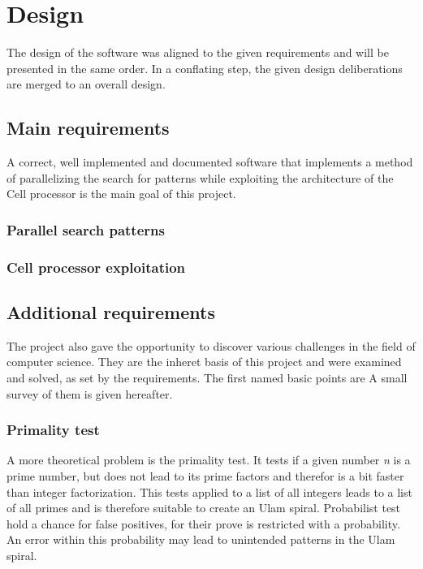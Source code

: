\section{Design}
\label{sec:design}
The design of the software was aligned to the given requirements and will be presented in the same order. In a conflating step, the given design deliberations are merged to an overall design.

\subsection{Main requirements}
\label{sec:main_req}
A correct, well implemented and documented software that implements a method of parallelizing the search for patterns while exploiting the architecture of the Cell processor is the main goal of this project.

\subsubsection{Parallel search patterns}
\label{sec:parallel_search}

\subsubsection{Cell processor exploitation}
\label{sec:cell_exploit}

\subsection{Additional requirements}
\label{sec:additional_req}
The project also gave the opportunity to discover various challenges in the field of computer science. They are the inheret basis of this project and were examined and solved, as set by the requirements. The first named basic points are A small survey of them is given hereafter.

\subsubsection{Primality test}
\label{sec:primality_test}
A more theoretical problem is the primality test. It tests if a given number \emph{n} is a prime number, but does not lead to its prime factors and therefor is a bit faster than integer factorization. This tests applied to a list of all integers leads to a list of all primes and is therefore suitable to create an Ulam spiral. Probabilist test hold a chance for false positives, for their prove is restricted with a probability. An error within this probability may lead to unintended patterns in the Ulam spiral.

